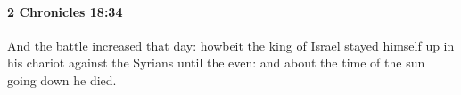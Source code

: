 
		\paragraph{2 Chronicles 18:34} %
			\label{2CHRONICLES-18-34}

			And the battle increased that day: howbeit the king of Israel stayed himself up in his chariot against the Syrians until the even: and about the time of the sun going down he died.

